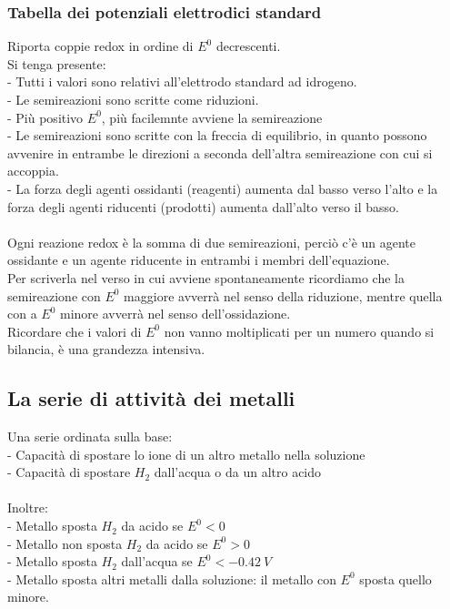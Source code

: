 \subsubsection{Tabella dei potenziali elettrodici standard}
Riporta coppie redox in ordine di $E^0$ decrescenti.\\
Si tenga presente:\\
\tab- Tutti i valori sono relativi all'elettrodo standard ad idrogeno.\\
\tab- Le semireazioni sono scritte come riduzioni.\\
\tab- Più positivo $E^0$, più facilemnte avviene la semireazione\\
\tab- Le semireazioni sono scritte con la freccia di equilibrio, in quanto possono avvenire in entrambe le direzioni a seconda dell'altra semireazione con cui si accoppia.\\
\tab- La forza degli agenti ossidanti (reagenti) aumenta dal basso verso l'alto e la forza degli agenti riducenti (prodotti) aumenta dall'alto verso il basso.\\\\
Ogni reazione redox è la somma di due semireazioni, perciò c'è un agente ossidante e un agente riducente in entrambi i membri dell'equazione.\\
Per scriverla nel verso in cui avviene spontaneamente ricordiamo che la semireazione con $E^0$ maggiore avverrà nel senso della riduzione, mentre quella con a $E^0$ minore avverrà nel senso dell'ossidazione.\\
Ricordare che i valori di $E^0$ non vanno moltiplicati per un numero quando si bilancia, è una grandezza intensiva.\\
\subsection{La serie di attività dei metalli}
Una serie ordinata sulla base:\\
\tab- Capacità di spostare lo ione di un altro metallo nella soluzione\\
\tab- Capacità di spostare $H_2$ dall'acqua o da un altro acido\\\\
Inoltre:\\
\tab- Metallo sposta $H_2$ da acido se $E^0 < 0$\\
\tab- Metallo non sposta $H_2$ da acido se $E^0 > 0$\\
\tab- Metallo sposta $H_2$ dall'acqua se $E^0 < -0.42\ V$\\
\tab- Metallo sposta altri metalli dalla soluzione: il metallo con $E^0$ sposta quello minore.\\
